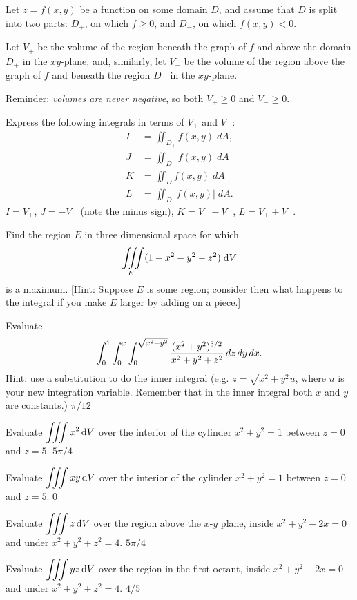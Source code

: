 \begin{multicols}{2}
\problem Let $z=f(x, y)$ be a function on some domain $D$, 
and assume that $D$ is split into two parts:  $D_+$, on which
$f\geq 0$, and $D_-$, on which $f(x, y)<0$.

Let $V_+$ be the volume of the region beneath the graph of $f$ and above the
domain $D_+$ in the $xy$-plane, and, similarly, let $V_-$ be the
volume of the region above the graph of $f$ and beneath the region
$D_-$ in the $xy$-plane.

Reminder:  \emph{volumes are never negative}, so both $V_+\ge0$ and
$V_-\ge0$.

\subprob Express the following integrals in terms of $V_+$ and 
$V_-$:
\begin{align*}
  I &= \iint_{D_+}f(x, y)\; dA, \\
  J &= \iint_{D_-}f(x, y)\; dA \\
  K &= \iint_{D}f(x, y)\; dA \\
  L &= \iint_{D}|f(x, y)|\; dA.
\end{align*}
\answer
$I=V_+$, $J= -V_-$ (note the minus sign),
$K= V_+-V_-$, $L = V_+ + V_-$.
\endanswer

\subprob Find the region $E$ in three dimensional space for which
\[
\displaystyle\iiint\limits_{E} (1-x^2-y^2-z^2) \; \mathrm{d} V
\]
is a maximum.  [Hint: Suppose $E$ is some region; consider then 
what happens to the integral if you make $E$ larger by adding on a
piece.]






\problem Evaluate
\[
\int_{0}^{1}\int_{0}^{x}\int_{0}^{\sqrt{x^2+y^2}} 
{(x^2+y^2)^{3/2}\over x^2+y^2+z^2}\,dz\,dy\,dx.  
\]
Hint:  use a substitution to do the inner integral (e.g. $z=\sqrt{x^2+y^2} u$, where $u$ is your new integration variable.  Remember that in the inner integral both $x$ and $y$ are constants.)
\answer
$\pi/12$
\endanswer

\problem Evaluate $\displaystyle\iiint x^2\,\mathrm{d} V $ 
over the interior of the cylinder $x^2+y^2=1$ between $z=0$ and $z=5$.
\answer
$5\pi/4$
\endanswer

\problem Evaluate $\displaystyle\iiint xy\,\mathrm{d} V $ 
over the interior of the cylinder $x^2+y^2=1$ between $z=0$ and $z=5$.
\answer
$0$
\endanswer

\problem Evaluate $\displaystyle\iiint z\,\mathrm{d} V $ 
over the region above the $x$-$y$ plane, inside $x^2+y^2-2x=0$ and
under $x^2+y^2+z^2=4$.
\answer
$5\pi/4$
\endanswer

\problem Evaluate $\displaystyle\iiint yz\,\mathrm{d} V $ 
over the region in the first octant, inside $x^2+y^2-2x=0$ and 
under $x^2+y^2+z^2=4$.
\answer
$4/5$
\endanswer


\end{multicols}
